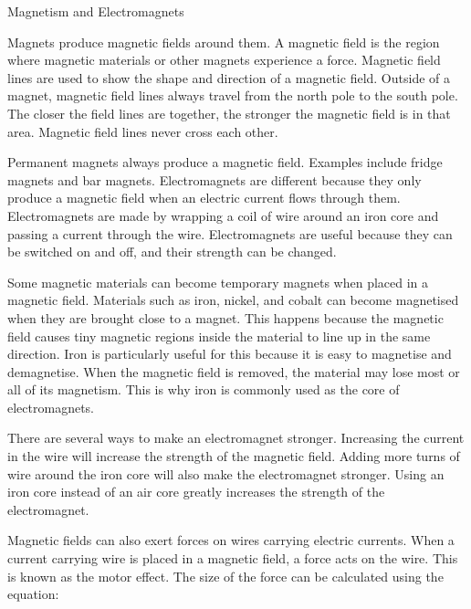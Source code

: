 \documentclass[12pt]{article}
\begin{document}
\begin{center}
    {\LARGE Magnetism and Electromagnets}
\end{center}

\vspace{1em}

Magnets produce magnetic fields around them. A magnetic field is the region where magnetic materials or other magnets experience a force. Magnetic field lines are used to show the shape and direction of a magnetic field. Outside of a magnet, magnetic field lines always travel from the north pole to the south pole. The closer the field lines are together, the stronger the magnetic field is in that area. Magnetic field lines never cross each other.

\vspace{1em}

Permanent magnets always produce a magnetic field. Examples include fridge magnets and bar magnets. Electromagnets are different because they only produce a magnetic field when an electric current flows through them. Electromagnets are made by wrapping a coil of wire around an iron core and passing a current through the wire. Electromagnets are useful because they can be switched on and off, and their strength can be changed.

\vspace{1em}

Some magnetic materials can become temporary magnets when placed in a magnetic field. Materials such as iron, nickel, and cobalt can become magnetised when they are brought close to a magnet. This happens because the magnetic field causes tiny magnetic regions inside the material to line up in the same direction. Iron is particularly useful for this because it is easy to magnetise and demagnetise. When the magnetic field is removed, the material may lose most or all of its magnetism. This is why iron is commonly used as the core of electromagnets.

\vspace{1em}

There are several ways to make an electromagnet stronger. Increasing the current in the wire will increase the strength of the magnetic field. Adding more turns of wire around the iron core will also make the electromagnet stronger. Using an iron core instead of an air core greatly increases the strength of the electromagnet.

\vspace{1em}

Magnetic fields can also exert forces on wires carrying electric currents. When a current carrying wire is placed in a magnetic field, a force acts on the wire. This is known as the motor effect. The size of the force can be calculated using the equation:
\end{document}
